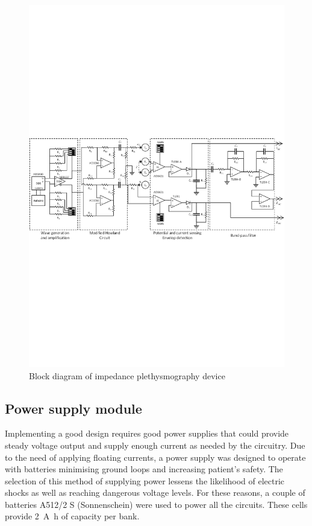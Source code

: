 \begin{landscape}\centering
	\vspace*{\fill}
	\begin{figure}[!htp]
		\includegraphics[height=0.59\textheight,keepaspectratio]{figure2}
	    \caption{Block diagram of impedance plethysmography device}
	    \label{fig:block}
	\end{figure}
    \vspace*{\fill}
\end{landscape}

\subsection{Power supply module}
\label{section design battery}
Implementing a good design requires good power supplies that could provide steady voltage output and supply enough current as needed by the circuitry. Due to the need of applying floating currents, a power supply was designed to operate with batteries minimising ground loops and increasing patient's safety.  The selection of this method of supplying power lessens the likelihood of electric shocks as well as reaching dangerous voltage levels. For these reasons, a couple of batteries A512/2 S (Sonnenschein) were used to power all the circuits. These cells provide \SI{2}{\ampere\hour} of capacity per bank.

